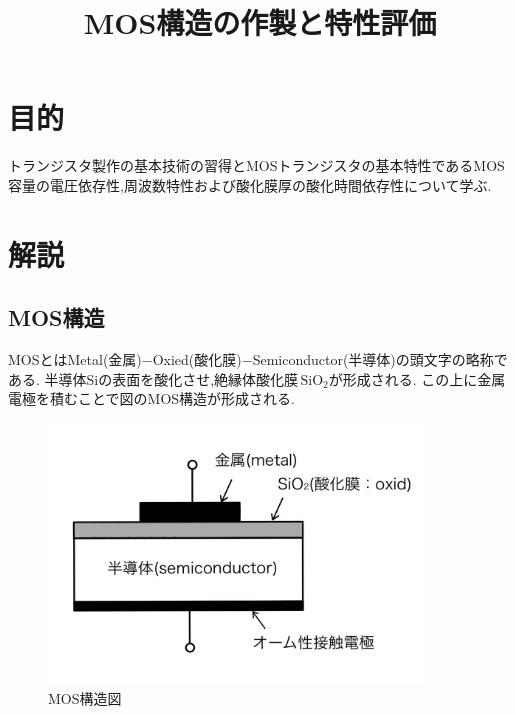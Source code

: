 \documentclass[11pt]{jarticle}
\title{MOS構造の作製と特性評価}
\begin{document}
\maketitle

\section{目的}
	トランジスタ製作の基本技術の習得とMOSトランジスタの基本特性であるMOS容量の電圧依存性,周波数特性および酸化膜厚の酸化時間依存性について学ぶ.

\section{解説}
	\subsection{MOS構造}
		MOSとはMetal(金属)−Oxied(酸化膜)−Semiconductor(半導体)の頭文字の略称である.
		半導体Siの表面を酸化させ,絶縁体酸化膜\,$\mathrm{SiO_{2}}$が形成される.
		この上に金属電極を積むことで図のMOS構造が形成される.

		\begin{figure}[H]
		\centering
		\includegraphics[width = 10cm]{figs/IMG_0209.JPG}
		\caption{MOS構造図}
		\label{fig:MOSstructure}
		\end{figure}
\end{document}
